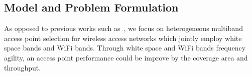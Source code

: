 %
%

\subsection{Model and Problem Formulation}
\label{subsec:problem}

As opposed to previous works such as~\cite{franklin2007node,robinson2010deploying,si2010overview}, 
we focus on heterogeneous multiband access point selection 
for wireless access networks which jointly employ white space bands and WiFi bands.
Through white space and WiFi bands frequency agility, an access point performance could be
improve by the coverage area and throughput. 


